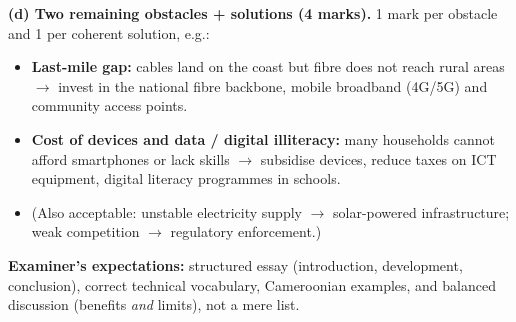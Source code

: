 \documentclass[11pt]{article}
\begin{document}
\begin{corrige}
\textbf{(d) Two remaining obstacles + solutions (4 marks).} 1 mark per obstacle and 1 per coherent solution, e.g.:
\begin{itemize}
\item \textbf{Last-mile gap:} cables land on the coast but fibre does not reach rural areas $\rightarrow$ invest in the national fibre backbone, mobile broadband (4G/5G) and community access points.
\item \textbf{Cost of devices and data / digital illiteracy:} many households cannot afford smartphones or lack skills $\rightarrow$ subsidise devices, reduce taxes on ICT equipment, digital literacy programmes in schools.
\item (Also acceptable: unstable electricity supply $\rightarrow$ solar-powered infrastructure; weak competition $\rightarrow$ regulatory enforcement.)
\end{itemize}
\textbf{Examiner's expectations:} structured essay (introduction, development, conclusion), correct technical vocabulary, Cameroonian examples, and balanced discussion (benefits \emph{and} limits), not a mere list.
\end{corrige}
\end{document}
